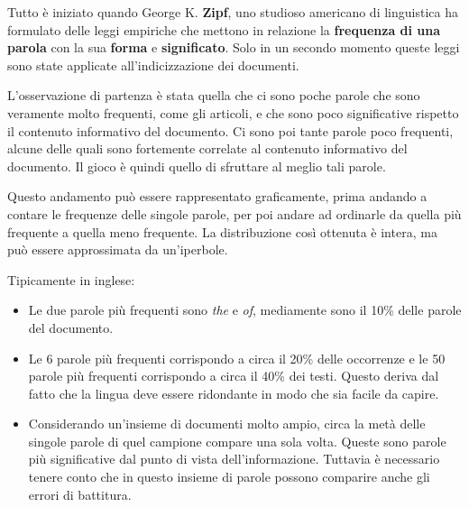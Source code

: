 


Tutto è iniziato quando George K. \textbf{Zipf}, uno studioso americano di linguistica ha formulato delle leggi empiriche che mettono in relazione la \textbf{frequenza di una parola} con la sua \textbf{forma} e \textbf{significato}. 
Solo in un secondo momento queste leggi sono state applicate all'indicizzazione dei documenti.

L'osservazione di partenza è stata quella che ci sono poche parole che sono veramente molto frequenti, come gli articoli, e che sono poco significative rispetto il contenuto informativo del documento. Ci sono poi tante parole poco frequenti, alcune delle quali sono fortemente correlate al contenuto informativo del documento. Il gioco è quindi quello di sfruttare al meglio tali parole.

Questo andamento può essere rappresentato graficamente, prima andando a contare le frequenze delle singole parole, per poi andare ad ordinarle da quella più frequente a quella meno frequente. La distribuzione così ottenuta è intera, ma può essere approssimata da un'iperbole.

Tipicamente in inglese:
\begin{itemize}
	\item Le due parole più frequenti sono \textit{the} e \textit{of}, mediamente sono il 10\% delle parole del documento.
	\item Le 6 parole più frequenti corrispondo a circa il 20\% delle occorrenze e le 50 parole più frequenti corrispondo a circa il 40\% dei testi. Questo deriva dal fatto che la lingua deve essere ridondante in modo che sia facile da capire.
	\item Considerando un'insieme di documenti molto ampio, circa la metà delle singole parole di quel campione compare una sola volta. Queste sono parole più significative dal punto di vista dell'informazione. Tuttavia è necessario tenere conto che in questo insieme di parole possono comparire anche gli errori di battitura.
\end{itemize}

